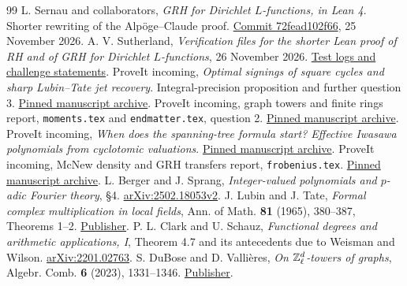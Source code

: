 \begin{thebibliography}{99}\small
{} L. Sernau and collaborators, \emph{GRH for Dirichlet $L$-functions, in Lean 4}. Shorter rewriting of the Alp\"oge--Claude proof. \href{https://github.com/lsernau/grh-lean/tree/72fead102f663d5c7a407964a13dc0cf9d977207}{Commit 72fead102f66}, 25 November 2026.
 A. V. Sutherland, \emph{Verification files for the shorter Lean proof of RH and of GRH for Dirichlet $L$-functions}, 26 November 2026. \href{https://math.mit.edu/~drew/shortgrh/}{Test logs and challenge statements}.
 ProveIt incoming, \emph{Optimal signings of square cycles and sharp Lubin--Tate jet recovery}. Integral-precision proposition and further question 3. \href{https://github.com/VladimirReshetnikov/ProveIt/blob/1677488425e45c3df14149c804014133798136a5/docs/incoming/grh_transfers_cycle_signings_and_lubin_tate.zip}{Pinned manuscript archive}.
 ProveIt incoming, graph towers and finite rings report, \texttt{moments.tex} and \texttt{endmatter.tex}, question 2. \href{https://github.com/VladimirReshetnikov/ProveIt/blob/1677488425e45c3df14149c804014133798136a5/docs/incoming/grh_method_transfers_graph_towers_and_finite_rings.zip}{Pinned manuscript archive}.
 ProveIt incoming, \emph{When does the spanning-tree formula start? Effective Iwasawa polynomials from cyclotomic valuations}. \href{https://github.com/VladimirReshetnikov/ProveIt/blob/1677488425e45c3df14149c804014133798136a5/docs/incoming/Effective_Graph_Towers.zip}{Pinned manuscript archive}.
 ProveIt incoming, McNew density and GRH transfers report, \texttt{frobenius.tex}. \href{https://github.com/VladimirReshetnikov/ProveIt/blob/1677488425e45c3df14149c804014133798136a5/docs/incoming/mcnew_density_and_grh_transfers.zip}{Pinned manuscript archive}.
 L. Berger and J. Sprang, \emph{Integer-valued polynomials and $p$-adic Fourier theory}, \S4. \href{https://arxiv.org/html/2502.18053v2}{arXiv:2502.18053v2}.
 J. Lubin and J. Tate, \emph{Formal complex multiplication in local fields}, Ann. of Math. \textbf{81} (1965), 380--387, Theorems 1--2. \href{https://doi.org/10.2307/1970622}{Publisher}.
 P. L. Clark and U. Schauz, \emph{Functional degrees and arithmetic applications, I}, Theorem 4.7 and its antecedents due to Weisman and Wilson. \href{https://arxiv.org/abs/2201.02763}{arXiv:2201.02763}.
 S. DuBose and D. Valli\`eres, \emph{On $\mathbb Z_\ell^d$-towers of graphs}, Algebr. Comb. \textbf{6} (2023), 1331--1346. \href{https://doi.org/10.5802/alco.304}{Publisher}.

\end{thebibliography}
